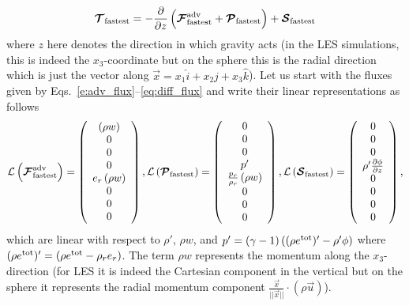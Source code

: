 \documentclass{article}
\begin{document}
\[
 \boldsymbol{{\mathcal{T}}}_{\mathrm{fastest}}=- \frac{\partial }{\partial z} \left( \boldsymbol{{\mathcal{F}}}^{\mathrm{adv}}_{\mathrm{fastest}} + \boldsymbol{{\mathcal{P}}}_{\mathrm{fastest}} \right) + \boldsymbol{{\mathcal{S}}}_{\mathrm{fastest}}
 \]
 where $z$ here denotes the direction in which gravity acts (in the LES simulations, this is indeed the $x_{3}$-coordinate but on the sphere this is the radial direction which is just the vector along $\vec{x}=x_{1} \hat{i} + x_{2} \hat{j} + x_{3} \hat{k}$).  Let us start with the fluxes given by Eqs.\ \eqref{e:adv_flux}--\eqref{eq:diff_flux} and write their linear representations as follows
 \begin{equation}
 \mathcal{L} \left( \boldsymbol{{\mathcal{F}}}^{\mathrm{adv}}_{\mathrm{fastest}} \right)=\left( \begin{array}{c}
 \left( \rho w \right) \\
 0 \\
 0 \\
 0 \\
 e_r \left( \rho w \right) \\
0 \\
0 \\
0
\end{array}
\right), 
\mathcal{L} \left( \boldsymbol{{\mathcal{P}}}_{\mathrm{fastest}} \right) = \left( \begin{array}{c}
0 \\
0 \\
0 \\
p' \\
\frac{p_r}{\rho_r} \left( \rho w \right) \\
0 \\
0 \\
0 
\end{array}
\right),
\mathcal{L} \left( \boldsymbol{{\mathcal{S}}}_{\mathrm{fastest}} \right) = \left( \begin{array}{c}
0 \\
0 \\
0 \\
\rho' \frac{\partial \phi}{\partial z} \\
0 \\
0 \\
0 \\
0 
\end{array}
\right),
\label{eq:fluxes_linear_1d}
\end{equation}
which are linear with respect to $\rho'$, $\rho w$, and 
$p'=(\gamma-1)\left((\rho e^{\mathrm{tot}})' - \rho' \phi\right)$ where
$(\rho e^{\mathrm{tot}})'=(\rho e^{\mathrm{tot}} - \rho_r e_r)$.  The term $\rho w$ represents the momentum along the $x_{3}$-direction (for LES it is indeed the Cartesian component in the vertical but on the sphere it represents the radial momentum component $\frac{\vec{x}}{||\vec{x}||} \cdot \left(\rho \vec{u}\right)$).
\end{document}
